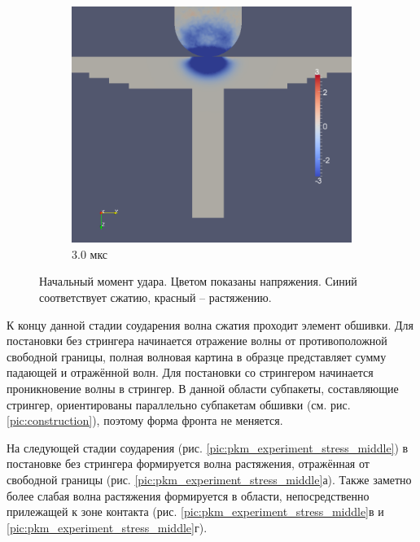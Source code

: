 \begin{figure}[H]
\begin{subfigure}[b]{0.5\textwidth}
\includegraphics[width=\textwidth]{png/pkm-experiment/wing-stringer/wave/syy-0003.png}
\caption{3.0 мкс}
\end{subfigure}
\caption{Начальный момент удара. Цветом показаны напряжения. Синий соответствует сжатию, красный -- растяжению.}
\label{pic:pkm_experiment_stress_begin}
\end{figure}

К концу данной стадии соударения волна сжатия проходит элемент обшивки. Для постановки без стрингера начинается отражение волны от противоположной свободной границы, полная волновая картина в образце представляет сумму падающей и отражённой волн. Для постановки со стрингером начинается проникновение волны в стрингер. В данной области субпакеты, составляющие стрингер, ориентированы параллельно субпакетам обшивки (см. рис. \ref{pic:construction}), поэтому форма фронта не меняется.

На следующей стадии соударения (рис. \ref{pic:pkm_experiment_stress_middle}) в постановке без стрингера формируется волна растяжения, отражённая от свободной границы (рис. \ref{pic:pkm_experiment_stress_middle}а). Также заметно более слабая волна растяжения формируется в области, непосредственно прилежащей к зоне контакта (рис. \ref{pic:pkm_experiment_stress_middle}в и \ref{pic:pkm_experiment_stress_middle}г).

